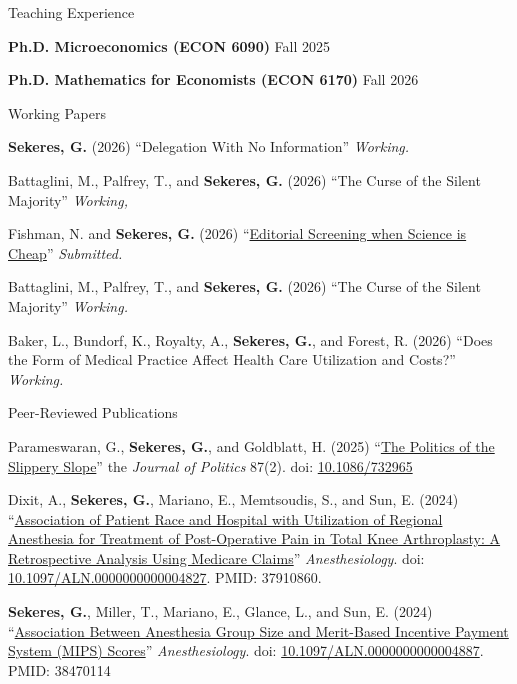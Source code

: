 \documentclass{resume}
\begin{document}
\begin{rSection}{Teaching Experience}
	\item \textbf{Ph.D. Microeconomics (ECON 6090)} \hfill Fall 2025
	\item \textbf{Ph.D. Mathematics for Economists (ECON 6170)} \hfill Fall 2026
\end{rSection}
\begin{rSection}{Working Papers}
\vspace{-0.5cm}
\item \textbf{Sekeres, G.} (2026) ``Delegation With No Information'' \emph{Working.}
\item Battaglini, M., Palfrey, T., and \textbf{Sekeres, G.} (2026) ``The Curse of the Silent Majority'' \emph{Working,}
\item Fishman, N. and \textbf{Sekeres, G.} (2026) ``\href{https://gabesekeres.com/assets/papers/cheap-science/gsekeres_cheap_science.pdf}{Editorial Screening when Science is Cheap}'' \emph{Submitted.}

\item Battaglini, M., Palfrey, T., and \textbf{Sekeres, G.} (2026) ``The Curse of the Silent Majority'' \emph{Working.}

\item Baker, L., Bundorf, K., Royalty, A., \textbf{Sekeres, G.}, and Forest, R. (2026) ``Does the Form of Medical Practice Affect Health Care Utilization and Costs?'' \emph{Working.}
\end{rSection}

\begin{rSection}{Peer-Reviewed Publications}
\vspace{-0.5cm}
	\item Parameswaran, G., \textbf{Sekeres, G.}, and Goldblatt, H. (2025) ``\href{https://gabesekeres.com/assets/papers/slippery-slope/gsekeres_slippery_slope.pdf}{The Politics of the Slippery Slope}'' the \emph{Journal of Politics} 87(2). doi: \href{https://doi.org/10.1086/732965}{10.1086/732965}
    \item Dixit, A., \textbf{Sekeres, G.}, Mariano, E., Memtsoudis, S., and Sun, E. (2024) ``\href{https://gabesekeres.com/assets/papers/nerve-blocks/gsekeres_tka_paper.pdf}{Association of Patient Race and Hospital with Utilization of Regional Anesthesia for Treatment of Post-Operative Pain in Total Knee Arthroplasty: A Retrospective Analysis Using Medicare Claims}'' \emph{Anesthesiology}. doi: \href{https://doi.org/10.1097/aln.0000000000004827}{10.1097/ALN.0000000000004827}. PMID: 37910860.
    \item \textbf{Sekeres, G.}, Miller, T., Mariano, E., Glance, L., and Sun, E. (2024) ``\href{https://gabesekeres.com/assets/papers/mips/gsekeres_mips_paper.pdf}{Association Between Anesthesia Group Size and Merit-Based Incentive Payment System (MIPS) Scores}'' \emph{Anesthesiology}. doi: \href{https://doi.org/10.1097/ALN.0000000000004887}{10.1097/ALN.0000000000004887}. PMID: 38470114
\end{rSection}
\end{document}
